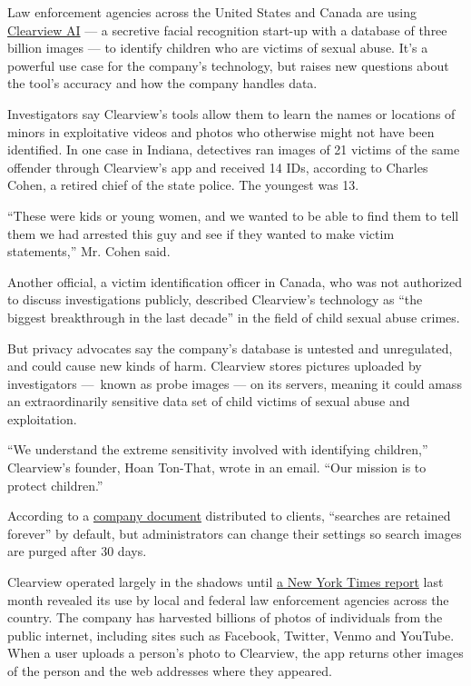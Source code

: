 Law enforcement agencies across the United States and Canada are using
\href{https://www.nytimes.com/2020/02/10/podcasts/the-daily/facial-recognition-surveillance.html}{Clearview
AI} --- a secretive facial recognition start-up with a database of three
billion images --- to identify children who are victims of sexual abuse.
It's a powerful use case for the company's technology, but raises new
questions about the tool's accuracy and how the company handles data.

Investigators say Clearview's tools allow them to learn the names or
locations of minors in exploitative videos and photos who otherwise
might not have been identified. In one case in Indiana, detectives ran
images of 21 victims of the same offender through Clearview's app and
received 14 IDs, according to Charles Cohen, a retired chief of the
state police. The youngest was 13.

``These were kids or young women, and we wanted to be able to find them
to tell them we had arrested this guy and see if they wanted to make
victim statements,'' Mr. Cohen said.

Another official, a victim identification officer in Canada, who was not
authorized to discuss investigations publicly, described Clearview's
technology as ``the biggest breakthrough in the last decade'' in the
field of child sexual abuse crimes.

But privacy advocates say the company's database is untested and
unregulated, and could cause new kinds of harm. Clearview stores
pictures uploaded by investigators ---~known as probe images --- on its
servers, meaning it could amass an extraordinarily sensitive data set of
child victims of sexual abuse and exploitation.

``We understand the extreme sensitivity involved with identifying
children,'' Clearview's founder, Hoan Ton-That, wrote in an email. ``Our
mission is to protect children.''

According to a
\href{https://int.nyt.com/data/documenthelper/6690-clearview-faq/c8b081a0bcca12e7903a/optimized/full.pdf\#page=1}{company
document} distributed to clients, ``searches are retained forever'' by
default, but administrators can change their settings so search images
are purged after 30 days.

Clearview operated largely in the shadows until
\href{https://www.nytimes.com/2020/01/18/technology/clearview-privacy-facial-recognition.html}{a
New York Times report} last month revealed its use by local and federal
law enforcement agencies across the country. The company has harvested
billions of photos of individuals from the public internet, including
sites such as Facebook, Twitter, Venmo and YouTube. When a user uploads
a person's photo to Clearview, the app returns other images of the
person and the web addresses where they appeared.

